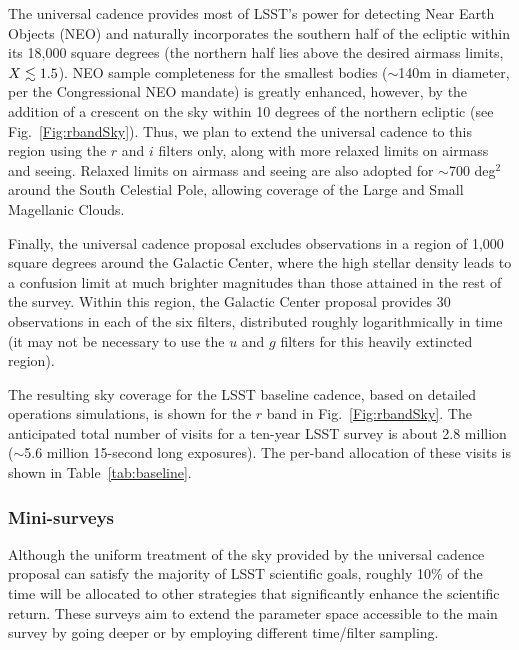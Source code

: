 The universal cadence provides most of LSST's power for detecting Near Earth
Objects (NEO) and naturally incorporates the southern half of the ecliptic
within its 18,000 square degrees (the northern half lies above the desired airmass
limits, $X\lesssim1.5$). NEO sample completeness for the smallest bodies ($\sim$140m in
diameter, per the Congressional NEO mandate) is greatly enhanced, however, by the
addition of a crescent on the sky within 10 degrees of the northern ecliptic
(see Fig.~\ref{Fig:rbandSky}). Thus, we plan to extend
 the universal cadence to this region using the
$r$ and $i$ filters only, along
with more relaxed limits on airmass and seeing. Relaxed limits on airmass and
seeing are also adopted for $\sim$700 deg$^2$ around the South Celestial
Pole, allowing coverage of the Large and Small Magellanic Clouds.

Finally, the universal cadence proposal excludes observations in a region of
1,000 square degrees around the Galactic Center, where the high stellar
density leads to a confusion limit at much brighter magnitudes than those
attained in the rest of the survey. Within this region, the Galactic Center
proposal provides 30 observations in each of the six filters, distributed
roughly logarithmically in time (it may not be necessary to use the
$u$ and $g$ filters for this heavily extincted region).

The resulting sky coverage for the LSST baseline
cadence, based on detailed operations simulations, is shown for the
$r$ band in Fig.~\ref{Fig:rbandSky}. The anticipated total number of visits
for a ten-year LSST survey is about 2.8 million ($\sim$5.6 million 15-second long
exposures). The per-band allocation of these visits is shown in Table~\ref{tab:baseline}.



\subsubsection{ Mini-surveys}
\label{Sec:minisurveys}

Although the uniform treatment of the sky provided by the universal cadence
proposal can satisfy the majority of LSST scientific goals, roughly 10\%
of the time will be allocated to other strategies that significantly enhance the
scientific return.  These surveys aim to extend the parameter space accessible
to the main survey by going deeper or by employing different time/filter
sampling.

